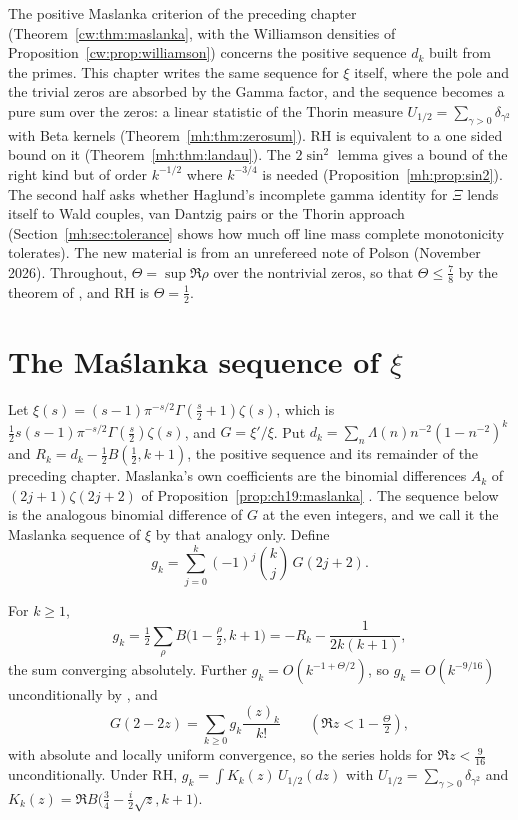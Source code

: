 \label{mh:ch:maslanka}
The positive Maslanka criterion of the preceding chapter (Theorem~\ref{cw:thm:maslanka}, with the Williamson densities of Proposition~\ref{cw:prop:williamson}) concerns the positive sequence $d_k$ built from the primes. This chapter writes the same sequence for $\xi$ itself, where the pole and the trivial zeros are absorbed by the Gamma factor, and the sequence becomes a pure sum over the zeros: a linear statistic of the Thorin measure $U_{1/2}=\sum_{\gamma>0}\delta_{\gamma^2}$ with Beta kernels (Theorem~\ref{mh:thm:zerosum}). RH is equivalent to a one sided bound on it (Theorem~\ref{mh:thm:landau}). The $2\sin^2$ lemma gives a bound of the right kind but of order $k^{-1/2}$ where $k^{-3/4}$ is needed (Proposition~\ref{mh:prop:sin2}). The second half asks whether Haglund's incomplete gamma identity for $\Xi$ lends itself to Wald couples, van Dantzig pairs or the Thorin approach (Section~\ref{mh:sec:tolerance} shows how much off line mass complete monotonicity tolerates). The new material is from an unrefereed note of Polson (November 2026). Throughout, $\Theta=\sup\Re\rho$ over the nontrivial zeros, so that $\Theta\le\frac78$ by the theorem of \cite{OAI26a}, and RH is $\Theta=\frac12$.

\section{The Ma\'slanka sequence of $\xi$}\label{mh:sec:zerosum}

Let $\xi(s)=(s-1)\pi^{-s/2}\Gamma(\tfrac s2+1)\zeta(s)$, which is $\frac12s(s-1)\pi^{-s/2}\Gamma(\frac s2)\zeta(s)$, and $G=\xi'/\xi$. Put $d_k=\sum_n\Lambda(n)n^{-2}(1-n^{-2})^k$ and $R_k=d_k-\tfrac12B(\tfrac12,k+1)$, the positive sequence and its remainder of the preceding chapter. Maslanka's own coefficients are the binomial differences $A_k$ of $(2j+1)\zeta(2j+2)$ of Proposition~\ref{prop:ch19:maslanka} \cite{Maslanka01,BaezDuarte10}. The sequence below is the analogous binomial difference of $G$ at the even integers, and we call it the Maslanka sequence of $\xi$ by that analogy only. Define
\[
g_k=\sum_{j=0}^k(-1)^j\binom kj\,G(2j+2).
\]

\begin{theorem}\label{mh:thm:zerosum}
For $k\ge1$,
\[
g_k=\tfrac12\sum_\rho B\big(1-\tfrac\rho2,k+1\big)=-R_k-\frac{1}{2k(k+1)} ,
\]
the sum converging absolutely. Further $g_k=O(k^{-1+\Theta/2})$, so $g_k=O(k^{-9/16})$ unconditionally by \cite{OAI26a}, and
\[
G(2-2z)=\sum_{k\ge0}g_k\frac{(z)_k}{k!}\qquad(\Re z<1-\tfrac\Theta2),
\]
with absolute and locally uniform convergence, so the series holds for $\Re z<\frac9{16}$ unconditionally. Under RH, $g_k=\int K_k(z)\,U_{1/2}(dz)$ with $U_{1/2}=\sum_{\gamma>0}\delta_{\gamma^2}$ and $K_k(z)=\Re B\big(\tfrac34-\tfrac i2\sqrt z,k+1\big)$.
\end{theorem}

